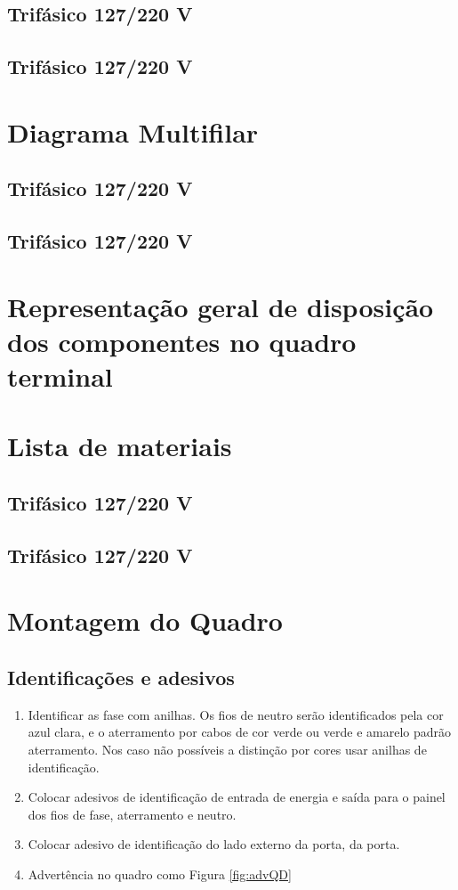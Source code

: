 \subsection{Trifásico 127/220 V}

\subsection{Trifásico 127/220 V}

\section{Diagrama Multifilar}

\subsection{Trifásico 127/220 V}

\subsection{Trifásico 127/220 V}

\section{Representação geral de disposição dos componentes no quadro terminal}

\section{Lista de materiais}

\subsection{Trifásico 127/220 V}

\subsection{Trifásico 127/220 V}
\section{Montagem do Quadro}

\subsection{Identificações e adesivos}
\begin{enumerate}
\item Identificar as fase com anilhas. Os fios de neutro serão identificados pela cor azul clara, e o aterramento por cabos de cor verde ou verde e amarelo padrão aterramento. Nos caso não possíveis a distinção por cores usar anilhas de identificação.
\item Colocar adesivos de identificação de entrada de energia e saída para o painel dos fios de fase, aterramento e neutro.
\item  Colocar adesivo de identificação do lado externo da porta, da porta.
\item Advertência no quadro como Figura \ref{fig:advQD}
\end{enumerate}


